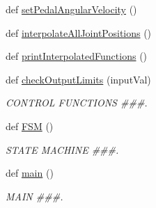 \begin{DoxyCompactItemize}
def \mbox{\hyperlink{namespacepedal__simulation__interpolation_a5e1840174dba3b2c2eefda1e71642411}{set\+Pedal\+Angular\+Velocity}} ()
\item 
def \mbox{\hyperlink{namespacepedal__simulation__interpolation_a4bc6f0c062987d99433d2ad211750299}{interpolate\+All\+Joint\+Positions}} ()
\item 
def \mbox{\hyperlink{namespacepedal__simulation__interpolation_aebd1f1a6fd3dc9f98c4264431d27aca0}{print\+Interpolated\+Functions}} ()
\item 
def \mbox{\hyperlink{namespacepedal__simulation__interpolation_ac12e75a6f9f23addd42552ffff096c24}{check\+Output\+Limits}} (input\+Val)
\begin{DoxyCompactList}\small\item\em C\+O\+N\+T\+R\+OL F\+U\+N\+C\+T\+I\+O\+NS \#\#\#. \end{DoxyCompactList}\item 
def \mbox{\hyperlink{namespacepedal__simulation__interpolation_acbe83f0c6c813527f3fd8afdb18823ac}{F\+SM}} ()
\begin{DoxyCompactList}\small\item\em S\+T\+A\+TE M\+A\+C\+H\+I\+NE \#\#\#. \end{DoxyCompactList}\item 
def \mbox{\hyperlink{namespacepedal__simulation__interpolation_ac4c91f942db63643e7475732425ac3d4}{main}} ()
\begin{DoxyCompactList}\small\item\em M\+A\+IN \#\#\#. \end{DoxyCompactList}\end{DoxyCompactItemize}
